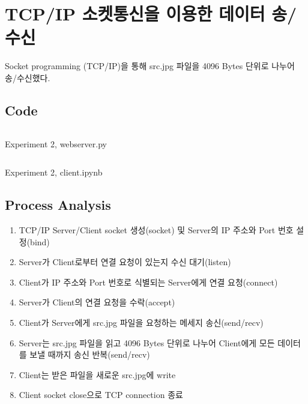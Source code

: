 \section{TCP/IP 소켓통신을 이용한 데이터 송/수신}
Socket programming (TCP/IP)을 통해 src.jpg 파일을 4096 Bytes 단위로 나누어 송/수신했다.

\subsection{Code}
\vspace{-4mm}
\begin{listing}[h!]
\inputminted[framerule = 1pt,framesep = 2mm , frame = lines, fontsize=\footnotesize]{python}{./code/week09/02/webserver.py}
\caption{\footnotesize Experiment 2, webserver.py}
\end{listing}
\clearpage

\vspace{-4mm}
\begin{listing}[h!]
\inputminted[framerule = 1pt,framesep = 2mm , frame = lines, fontsize=\footnotesize]{python}{./code/week09/02/client.py}
\caption{\footnotesize Experiment 2, client.ipynb}
\end{listing}

\subsection{Process Analysis}
\begin{enumerate}
    \item TCP/IP Server/Client socket 생성(socket) 및 Server의 IP 주소와 Port 번호 설정(bind)
    \item Server가 Client로부터 연결 요청이 있는지 수신 대기(listen)
    \item Client가 IP 주소와 Port 번호로 식별되는 Server에게 연결 요청(connect)
    \item Server가 Client의 연결 요청을 수락(accept)
    \item Client가 Server에게 src.jpg 파일을 요청하는 메세지 송신(send/recv)
    \item Server는 src.jpg 파일을 읽고 4096 Bytes 단위로 나누어 Client에게 모든 데이터를 보낼 때까지 송신 반복(send/recv)
    \item Client는 받은 파일을 새로운 src.jpg에 write
    \item Client socket close으로 TCP connection 종료
\end{enumerate}

